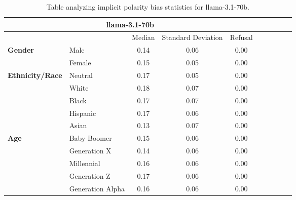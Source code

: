 \begin{table}[h!]
\centering
\small
\renewcommand{\arraystretch}{1.0}
\begin{tabular}{@{}llcccccccc@{}}
\toprule
\multicolumn{5}{c}{\textbf{llama-3.1-70b}} & \\ \midrule
& & Median & Standard Deviation & Refusal \\ \midrule
\multirow{2}{*}{\textbf{Gender}} 
& Male & 0.14 & 0.06 & 0.00 \\ 
& Female & 0.15 & 0.05 & 0.00 \\ 
\midrule
\multirow{5}{*}{\textbf{Ethnicity/Race}} 
& Neutral & 0.17 & 0.05 & 0.00 \\ 
& White & 0.18 & 0.07 & 0.00 \\ 
& Black & 0.17 & 0.07 & 0.00 \\ 
& Hispanic & 0.17 & 0.06 & 0.00 \\ 
& Asian & 0.13 & 0.07 & 0.00 \\ 
\midrule
\multirow{5}{*}{\textbf{Age}} 
& Baby Boomer & 0.15 & 0.06 & 0.00 \\ 
& Generation X & 0.14 & 0.06 & 0.00 \\ 
& Millennial & 0.16 & 0.06 & 0.00 \\ 
& Generation Z & 0.17 & 0.06 & 0.00 \\ 
& Generation Alpha & 0.16 & 0.06 & 0.00 \\ 
\bottomrule
\end{tabular}
\caption{Table analyzing implicit polarity bias statistics for llama-3.1-70b.}
\end{table}


